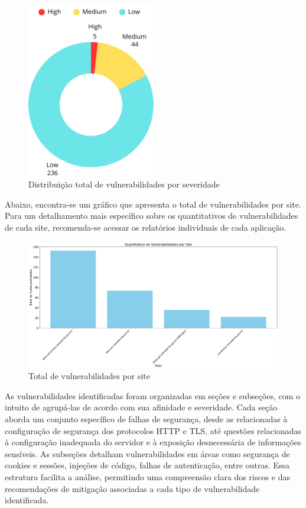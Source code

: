 \documentclass[a4paper,12pt]{article}
\begin{document}
\begin{figure}[h!]
    \centering
    \includegraphics[width=0.5\textwidth]{assets/images-was/Total_Vulnerabilidades.png}
    \caption{Distribuição total de vulnerabilidades por severidade}
\end{figure}
\FloatBarrier

Abaixo, encontra-se um gráfico que apresenta o total de vulnerabilidades por site. Para um detalhamento mais específico sobre os quantitativos de vulnerabilidades de cada site, recomenda-se acessar os relatórios individuais de cada aplicação.

\begin{figure}[h!]
    \centering
    \includegraphics[width=1.0\textwidth]{assets/images-was/Vulnerabilidades_x_site.png}
    \caption{Total de vulnerabilidades por site}
\end{figure}
\FloatBarrier
As vulnerabilidades identificadas foram organizadas em seções e subseções, com o intuito de agrupá-las de acordo com sua afinidade e severidade. Cada seção aborda um conjunto específico de falhas de segurança, desde as relacionadas à configuração de segurança dos protocolos HTTP e TLS, até questões relacionadas à configuração inadequada do servidor e à exposição desnecessária de informações sensíveis. As subseções detalham vulnerabilidades em áreas como segurança de cookies e sessões, injeções de código, falhas de autenticação, entre outras. Essa estrutura facilita a análise, permitindo uma compreensão clara dos riscos e das recomendações de mitigação associadas a cada tipo de vulnerabilidade identificada.
\end{document}
